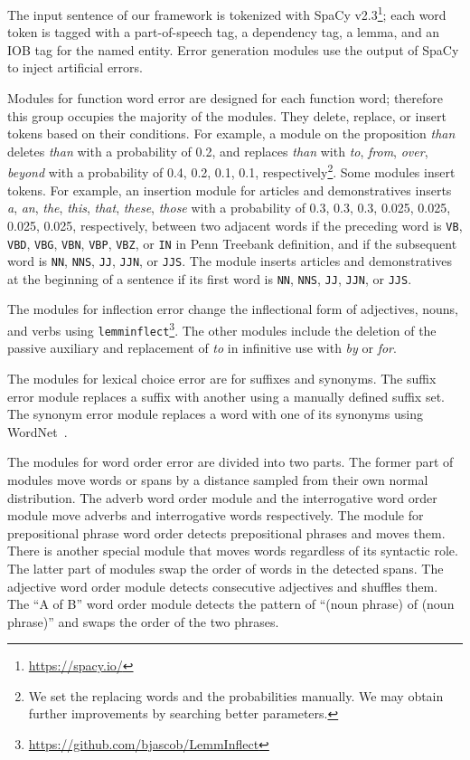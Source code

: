 \documentclass[11pt]{article}
\begin{document}
The input sentence of our framework is tokenized with SpaCy v2.3\footnote{\url{https://spacy.io/}};
each word token is tagged with a part-of-speech tag, a dependency tag, a lemma, and an IOB tag for the named entity.
Error generation modules use the output of SpaCy to inject artificial errors.

Modules for function word error are designed for each function word; therefore this group occupies the majority of the modules.
They delete, replace, or insert tokens based on their conditions.
For example, a module on the proposition \textit{than} deletes \textit{than} with a probability of 0.2,
and replaces \textit{than} with \textit{to}, \textit{from}, \textit{over}, \textit{beyond} with a probability of 0.4, 0.2, 0.1, 0.1, respectively\footnote{
	We set the replacing words and the probabilities manually.
	We may obtain further improvements by searching better parameters.}.
Some modules insert tokens.
For example, an insertion module for articles and demonstratives inserts \textit{a}, \textit{an}, \textit{the}, \textit{this}, \textit{that}, \textit{these}, \textit{those}
with a probability of 0.3, 0.3, 0.3, 0.025, 0.025, 0.025, 0.025, respectively, between two adjacent words if the preceding word is
\texttt{VB}, \texttt{VBD}, \texttt{VBG}, \texttt{VBN}, \texttt{VBP}, \texttt{VBZ}, or \texttt{IN} in Penn Treebank definition,
and if the subsequent word is \texttt{NN}, \texttt{NNS}, \texttt{JJ}, \texttt{JJN}, or \texttt{JJS}.
The module inserts articles and demonstratives at the beginning of a sentence if its first word is \texttt{NN}, \texttt{NNS}, \texttt{JJ}, \texttt{JJN}, or \texttt{JJS}.

The modules for inflection error change the inflectional form of adjectives, nouns, and verbs using \texttt{lemminflect}\footnote{\url{https://github.com/bjascob/LemmInflect}}.
The other modules include the deletion of the passive auxiliary and replacement of \textit{to} in infinitive use with \textit{by} or \textit{for}.

The modules for lexical choice error are for suffixes and synonyms.
The suffix error module replaces a suffix with another using a manually defined suffix set.
The synonym error module replaces a word with one of its synonyms using WordNet~\citep{miller1995wordnet}.

The modules for word order error are divided into two parts.
The former part of modules move words or spans by a distance sampled from their own normal distribution.
The adverb word order module and the interrogative word order module move adverbs and interrogative words respectively.
The module for prepositional phrase word order detects prepositional phrases and moves them.
There is another special module that moves words regardless of its syntactic role.
The latter part of modules swap the order of words in the detected spans.
The adjective word order module detects consecutive adjectives and shuffles them.
The ``A of B'' word order module detects the pattern of ``(noun phrase) of (noun phrase)'' and swaps the order of the two phrases.
\end{document}

